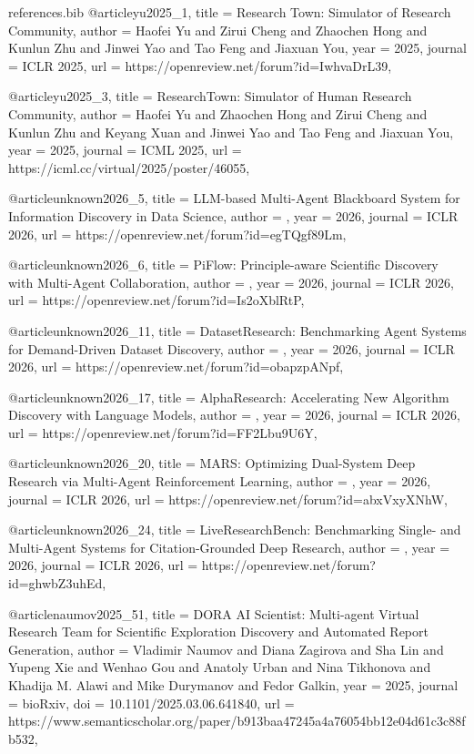 \begin{filecontents*}{references.bib}
@article{yu2025_1,
  title = {Research Town: Simulator of Research Community},
  author = {Haofei Yu and Zirui Cheng and Zhaochen Hong and Kunlun Zhu and Jinwei Yao and Tao Feng and Jiaxuan You},
  year = {2025},
  journal = {ICLR 2025},
  url = {https://openreview.net/forum?id=IwhvaDrL39},
}

@article{yu2025_3,
  title = {ResearchTown: Simulator of Human Research Community},
  author = {Haofei Yu and Zhaochen Hong and Zirui Cheng and Kunlun Zhu and Keyang Xuan and Jinwei Yao and Tao Feng and Jiaxuan You},
  year = {2025},
  journal = {ICML 2025},
  url = {https://icml.cc/virtual/2025/poster/46055},
}

@article{unknown2026_5,
  title = {LLM-based Multi-Agent Blackboard System for Information Discovery in Data Science},
  author = {},
  year = {2026},
  journal = {ICLR 2026},
  url = {https://openreview.net/forum?id=egTQgf89Lm},
}

@article{unknown2026_6,
  title = {PiFlow: Principle-aware Scientific Discovery with Multi-Agent Collaboration},
  author = {},
  year = {2026},
  journal = {ICLR 2026},
  url = {https://openreview.net/forum?id=Is2oXblRtP},
}

@article{unknown2026_11,
  title = {DatasetResearch: Benchmarking Agent Systems for Demand-Driven Dataset Discovery},
  author = {},
  year = {2026},
  journal = {ICLR 2026},
  url = {https://openreview.net/forum?id=obapzpANpf},
}

@article{unknown2026_17,
  title = {AlphaResearch: Accelerating New Algorithm Discovery with Language Models},
  author = {},
  year = {2026},
  journal = {ICLR 2026},
  url = {https://openreview.net/forum?id=FF2Lbu9U6Y},
}

@article{unknown2026_20,
  title = {MARS: Optimizing Dual-System Deep Research via Multi-Agent Reinforcement Learning},
  author = {},
  year = {2026},
  journal = {ICLR 2026},
  url = {https://openreview.net/forum?id=abxVxyXNhW},
}

@article{unknown2026_24,
  title = {LiveResearchBench: Benchmarking Single- and Multi-Agent Systems for Citation-Grounded Deep Research},
  author = {},
  year = {2026},
  journal = {ICLR 2026},
  url = {https://openreview.net/forum?id=ghwbZ3uhEd},
}

@article{naumov2025_51,
  title = {DORA AI Scientist: Multi-agent Virtual Research Team for Scientific Exploration Discovery and Automated Report Generation},
  author = {Vladimir Naumov and Diana Zagirova and Sha Lin and Yupeng Xie and Wenhao Gou and Anatoly Urban and Nina Tikhonova and Khadija M. Alawi and Mike Durymanov and Fedor Galkin},
  year = {2025},
  journal = {bioRxiv},
  doi = {10.1101/2025.03.06.641840},
  url = {https://www.semanticscholar.org/paper/b913baa47245a4a76054bb12e04d61c3c88fb532},
}


\end{filecontents*}
